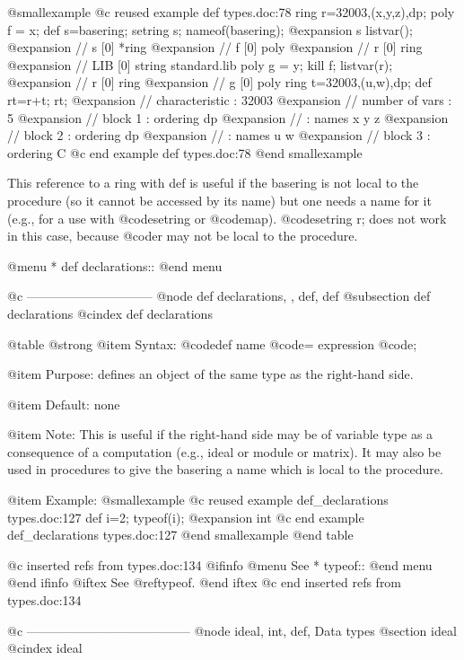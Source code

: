@smallexample
@c reused example def types.doc:78 
  ring r=32003,(x,y,z),dp;
  poly f = x;
  def s=basering;
  setring s;
  nameof(basering);
@expansion{} s
  listvar();
@expansion{} // s                    [0]  *ring
@expansion{} //      f                    [0]  poly
@expansion{} // r                    [0]  ring
@expansion{} // LIB                  [0]  string standard.lib
  poly g = y;
  kill f;
  listvar(r);
@expansion{} // r                    [0]  ring
@expansion{} // g                    [0]  poly
  ring t=32003,(u,w),dp;
  def rt=r+t;
  rt;
@expansion{} //   characteristic : 32003
@expansion{} //   number of vars : 5
@expansion{} //        block   1 : ordering dp
@expansion{} //                  : names    x y z 
@expansion{} //        block   2 : ordering dp
@expansion{} //                  : names    u w 
@expansion{} //        block   3 : ordering C
@c end example def types.doc:78
@end smallexample

This reference to a ring with def is useful if the basering
is not local to the procedure (so it cannot be accessed by its name) but one
needs a name for it (e.g., for a use with @code{setring} or @code{map}).
@code{setring r;} does not work in this case, because
@code{r} may not be local to the procedure.

@menu
* def declarations::
@end menu

@c ------------------------------
@node def declarations,  , def, def
@subsection def declarations
@cindex def declarations

@table @strong
@item Syntax:
@code{def} name @code{=} expression @code{;}

@item Purpose:
defines an object of the same type as the right-hand side.

@item Default:
none

@item Note:
This is useful if the right-hand side may be of
variable type as a consequence of a computation (e.g., ideal or module or
matrix). It may also be used in procedures to give the basering a name which
is local to the procedure.

@item Example:
@smallexample
@c reused example def_declarations types.doc:127 
  def i=2;
  typeof(i);
@expansion{} int
@c end example def_declarations types.doc:127
@end smallexample
@end table

@c inserted refs from types.doc:134
@ifinfo
@menu
See
* typeof::
@end menu
@end ifinfo
@iftex
See
@ref{typeof}.
@end iftex
@c end inserted refs from types.doc:134

@c ---------------------------------------
@node ideal, int, def, Data types
@section ideal
@cindex ideal

